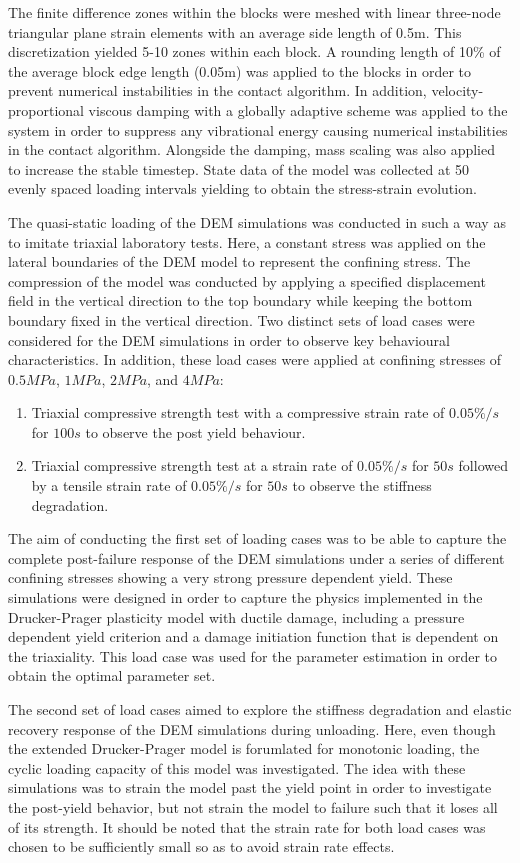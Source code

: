 The finite difference zones within the blocks were meshed with linear three-node triangular plane strain elements with an average side length of 0.5m. This discretization yielded 5-10 zones within each block. A rounding length of 10\% of the average block edge length (0.05m) was applied to the blocks in order to prevent numerical instabilities in the contact algorithm. In addition, velocity-proportional viscous damping with a globally adaptive scheme was applied to the system in order to suppress any vibrational energy causing numerical instabilities in the contact algorithm. Alongside the damping, mass scaling was also applied to increase the stable timestep. State data of the model was collected at 50 evenly spaced loading intervals yielding to obtain the stress-strain evolution. 

The quasi-static loading of the DEM simulations was conducted in such a way as to imitate triaxial laboratory tests. Here, a constant stress was applied on the lateral boundaries of the DEM model to represent the confining stress. The compression of the model was conducted by applying a specified displacement field in the vertical direction to the top boundary while keeping the bottom boundary fixed in the vertical direction. Two distinct sets of load cases were considered for the DEM simulations in order to observe key behavioural characteristics. In addition, these load cases were applied at confining stresses of $0.5MPa$, $1MPa$, $2MPa$, and $4MPa$:

\begin{enumerate}
\item Triaxial compressive strength test with a compressive strain rate of $0.05\%/s$ for $100s$ to observe the post yield behaviour.
\item Triaxial compressive strength test at a strain rate of $0.05\%/s$ for $50s$ followed by a tensile strain rate of $0.05\%/s$ for $50s$ to observe the stiffness degradation.
\end{enumerate}

The aim of conducting the first set of loading cases was to be able to capture the complete post-failure response of the DEM simulations under a series of different confining stresses showing a very strong pressure dependent yield. These simulations were designed in order to capture the physics implemented in the Drucker-Prager plasticity model with ductile damage, including a pressure dependent yield criterion and a damage initiation function that is dependent on the triaxiality. This load case was used for the parameter estimation in order to obtain the optimal parameter set.

The second set of load cases aimed to explore the stiffness degradation and elastic recovery response of the DEM simulations during unloading. Here, even though the extended Drucker-Prager model is forumlated for monotonic loading, the cyclic loading capacity of this model was investigated. The idea with these simulations was to strain the model past the yield point in order to investigate the post-yield behavior,
but not strain the model to failure such that it loses all of its strength. It should be noted that the strain rate for both load cases was chosen to be sufficiently small so as to avoid strain rate effects.
